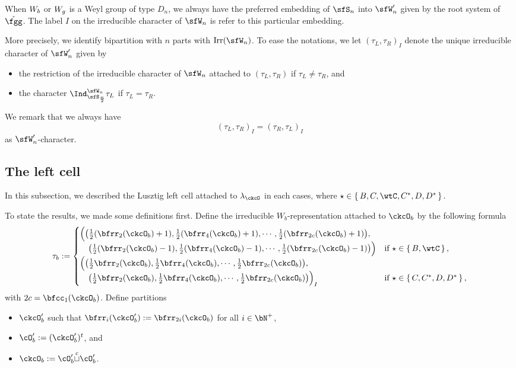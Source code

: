 \documentclass[12pt,a4paper]{amsart}
\numberwithin{equation}{section}
\theoremstyle{remark}
\def\half{{\tfrac{1}{2}}}
\def\Irr{\mathrm{Irr}}
\def\cupcol{{\stackrel{c}{\sqcup}}}
\def\ckfgg{{\check \fgg}}
\begin{document}
  When $W_{b}$ or $W_{g}$ is a Weyl group of type $D_{n}$, we always have the
  preferred embedding of $\sfS_{n}$ into $\sfW'_{n}$ given by the root system of
  $\ckfgg$. The label $I$ on the irreducible character of $\sfW_{n}$ is refer to
  this particular embedding.

  More precisely, we identify bipartition with $n$ parts with $\Irr(\sfW_{n})$.
  To ease the notations, we let $(\tau_{L},\tau_{R})_{I}$ denote
  the unique irreducible character of $\sfW'_{n}$ given by
  \begin{itemize}
    \item the restriction of
    the irreducible character of $\sfW_{n}$ attached to $(\tau_{L},\tau_{R})$ if
    $\tau_{L}\neq \tau_{R}$, and
    \item
    the character
    $\Ind_{\sfS_{\frac{n}{2}}}^{\sfW_{n}} \tau_{L}$ if $\tau_{L}=\tau_{R}$.
  \end{itemize}
  We remark that we always have
  \[
    (\tau_{L},\tau_{R})_{I}=(\tau_{R},\tau_{L})_{I}
  \]
  as $\sfW'_{n}$-character.


  \subsection{The left cell}
  In this subsection, we described the Lusztig left cell attached to
  $\lambda_{\ckcO}$ in each cases, where
  $\star \in \set{B,C,\wtC,C^{*},D,D^{*}}$.


  To state the results, we made some definitions first. Define the irreducible
  $W_{b}$-representation attached to $\ckcO_{b}$ by the following formula
  \[
    \tau_{b} := \begin{cases}
      \Big(\big(\half(\bfrr_{2}(\ckcO_{b})+1), \half(\bfrr_{4}(\ckcO_{b})+1), \cdots, \half(\bfrr_{2c}(\ckcO_{b})+1)\big),\\
      \hspace{1em}\big(\half(\bfrr_{2}(\ckcO_{b})-1), \half(\bfrr_{4}(\ckcO_{b})-1), \cdots, \half(\bfrr_{2c}(\ckcO_{b})-1) \big)\Big)
      & \text{if } \star \in \set{B,\wtC},\\
      \Big( \big(\half\bfrr_{2}(\ckcO_{b}), \half\bfrr_{4}(\ckcO_{b}),\cdots, \half\bfrr_{2c}(\ckcO_{b})\big), \\
      \hspace{1em} \big(\half\bfrr_{2}(\ckcO_{b}), \half\bfrr_{4}(\ckcO_{b}),\cdots, \half\bfrr_{2c}(\ckcO_{b}) \big)\Big)_{I}
      & \text{if } \star \in \set{C,C^{*}, D,D^{*}},\\
    \end{cases}
  \]
  with $2c = \bfcc_{1}(\ckcO_{b})$. Define partitions
  \begin{itemize}
    \item $\ckcO'_{b}$ such that $\bfrr_{i}(\ckcO'_{b}):= \bfrr_{2i}(\ckcO_{b})$
          for all $i\in \bN^{+}$,
    \item $\cO'_{b}:= (\ckcO'_{b})^{t}$, and
    \item $\ckcO_{b}:= \cO'_{b}\cupcol \cO'_{b}$.
  \end{itemize}
\end{document}
